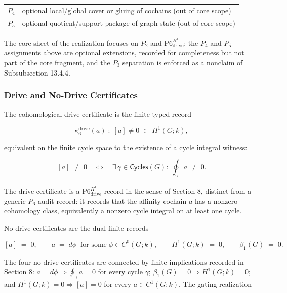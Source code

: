 \documentclass[11pt]{article}
\theoremstyle{definition}
\begin{document}
\begin{longtable}[]{@{}ll@{}}
\begin{minipage}[t]{0.26\columnwidth}\raggedright
\(P_{4}\)\strut
\end{minipage} & \begin{minipage}[t]{0.68\columnwidth}\raggedright
optional local/global cover or gluing of cochains (out of core scope)\strut
\end{minipage}\tabularnewline
\begin{minipage}[t]{0.26\columnwidth}\raggedright
\(P_{5}\)\strut
\end{minipage} & \begin{minipage}[t]{0.68\columnwidth}\raggedright
optional quotient/support package of graph state (out of core scope)\strut
\end{minipage}\tabularnewline
\bottomrule
\end{longtable}

The core sheet of the realization focuses on \(P_{2}\) and \(\mathrm{P6}_{\mathrm{drive}}^{H^1}\); the \(P_{4}\) and \(P_{5}\) assignments above are optional extensions, recorded for completeness but not part of the core fragment, and the \(P_{3}\) separation is enforced as a nonclaim of Subsubsection 13.4.4.

\subsubsection{Drive and No-Drive Certificates}

The cohomological drive certificate is the finite typed record

\[
\kappa_{6}^{\mathrm{drive}}(a)\;:\;[a]\neq 0\;\in\;H^{1}(G;k),
\]

equivalent on the finite cycle space to the existence of a cycle integral witness:

\[
[a]\;\neq\;0\quad\Longleftrightarrow\quad\exists\,\gamma\in\mathsf{Cycles}(G):\;\oint_{\gamma}a\;\neq\;0.
\]

The drive certificate is a \(\mathrm{P6}_{\mathrm{drive}}^{H^1}\) record in the sense of Section 8, distinct from a generic \(P_{6}\) audit record: it records that the affinity cochain \(a\) has a nonzero cohomology class, equivalently a nonzero cycle integral on at least one cycle.

No-drive certificates are the dual finite records

\[
[a]\;=\;0,\qquad a\;=\;d\phi\;\;\text{for some}\;\phi\in C^{0}(G;k),\qquad H^{1}(G;k)\;=\;0,\qquad\beta_{1}(G)\;=\;0.
\]

The four no-drive certificates are connected by finite implications recorded in Section 8: \(a=d\phi\Rightarrow\oint_{\gamma}a=0\) for every cycle \(\gamma\); \(\beta_{1}(G)=0\Rightarrow H^{1}(G;k)=0\); and \(H^{1}(G;k)=0\Rightarrow[a]=0\) for every \(a\in C^{1}(G;k)\). The gating realization
\end{document}
